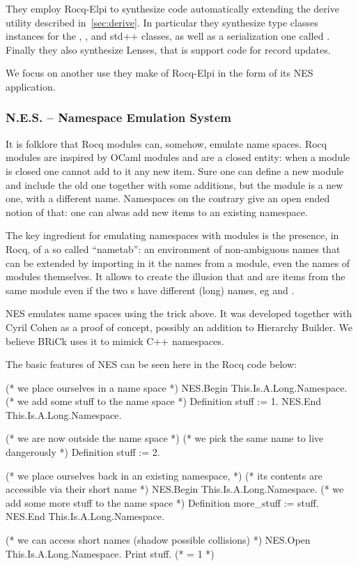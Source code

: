 \documentclass[a4paper, 11pt]{book}
\begin{document}
They employ Rocq-Elpi to synthesize code automatically extending the
derive utility described in~\cref{sec:derive}. In particular they synthesize
type classes instances for the , ,
 and  std++ classes, as well as a serialization
one called . Finally
they also synthesize Lenses, that is support code for record updates.

We focus on another use they make of Rocq-Elpi in the form of its
NES application.

\subsubsection{N.E.S. -- Namespace Emulation System}

It is folklore that Rocq modules can, somehow, emulate name spaces.
Rocq modules are inspired by OCaml modules and are a closed entity: when
a module is closed one cannot add to it any new item. Sure one can
define a new module and include the old one together with some additions,
but the module is a new one, with a different name. Namespaces on the
contrary give an open ended notion of that: one can alwas add new items
to an existing namespace.

The key ingredient for emulating namespaces with modules is the presence,
in Rocq, of a so called ``nametab'': an environment of non-ambiguous names
that can be extended by importing in it the names from a module, even the
names of modules themselves. It allows to create the illusion that 
and  are items from the same module  even if
the two s have different (long) names, eg 
and .

NES emulates name spaces using the trick above. It was developed
together with Cyril Cohen as a proof of concept, possibly an addition
to Hierarchy Builder. We believe BRiCk uses it to mimick C++ namespaces.

The basic features of NES can be seen here in the Rocq code below:

\begin{rocqcode}
(* we place ourselves in a name space *)
NES.Begin This.Is.A.Long.Namespace.
  (* we add some stuff to the name space *)
  Definition stuff := 1.
NES.End This.Is.A.Long.Namespace.

(* we are now outside the name space *)
(* we pick the same name to live dangerously *)
Definition stuff := 2.

(* we place ourselves back in an existing namespace, *)
(* its contents are accessible via their short name *)
NES.Begin This.Is.A.Long.Namespace.
  (* we add some more stuff to the name space *)
  Definition more_stuff := stuff.
NES.End This.Is.A.Long.Namespace.

(* we can access short names (shadow possible collisions) *)
NES.Open This.Is.A.Long.Namespace.
Print stuff. (* = 1 *)
\end{rocqcode}
\end{document}
